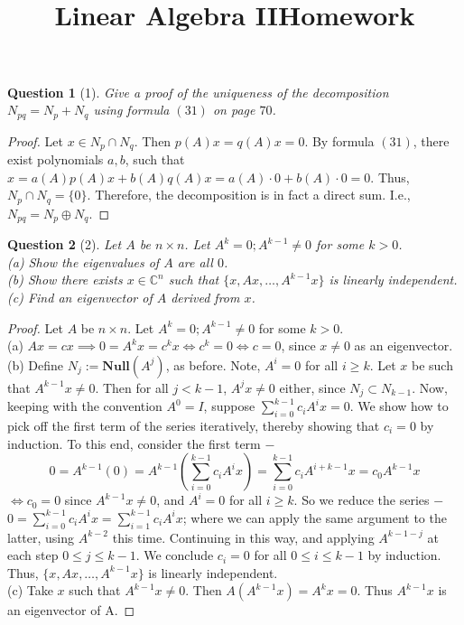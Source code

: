 \documentclass[11pt]{article}
\title{\vspace{-50pt}
\Huge \name
\\\vspace{20pt}
\huge Linear Algebra II\hfill Homework \hw}
\author{}
\date{}
\theoremstyle{quest}
\newtheorem*{question}{Question}
\begin{document}
\maketitle

\begin{question}[1]
Give a proof of the uniqueness of the decomposition $N_{pq} = N_p + N_q$ using formula $(31)$ on page $70$.
\end{question}
\begin{proof}
Let $x \in N_p \cap N_q$. Then $p(A)x = q(A)x = 0$. By formula $(31)$, there exist polynomials $a, b$, such that $x = a(A)p(A)x + b(A)q(A)x = a(A) \cdot 0 + b(A) \cdot 0 = 0$. Thus, $N_p \cap N_q = \{0\}$. Therefore, the decomposition is in fact a direct sum. I.e., $N_{pq} = N_p \oplus N_q$.
\end{proof}
\begin{question}[2]
Let $A$ be $n \times n$. Let $A^k = 0; A^{k-1} \ne 0$ for some $k > 0$.
\\(a) Show the eigenvalues of $A$ are all $0$.
\\(b) Show there exists $x \in \mathbb{C}^n$ such that $\{x, Ax, \ldots, A^{k-1}x\}$ is linearly independent.
\\(c) Find an eigenvector of $A$ derived from $x$.
\end{question}
\begin{proof}
Let $A$ be $n \times n$. Let $A^k = 0; A^{k-1} \ne 0$ for some $k > 0$.
\\(a) $Ax = cx \implies 0 = A^k x = c^k x \iff c^k = 0 \iff c = 0$, since $x \ne 0$ as an eigenvector.
\\ (b) Define $N_j := \mathbf{Null}(A^j)$, as before. Note, $A^i = 0$ for all $i \ge k$. Let $x$ be such that $A^{k-1}x \ne 0$. Then for all $j < k-1$, $A^j x \ne 0$ either, since $N_j \subset N_{k-1}$. Now, keeping with the convention $A^0 = I$, suppose $\sum_{i = 0}^{k-1} c_i A^i x = 0$. We show how to pick off the first term of the series iteratively, thereby showing that $c_i = 0$ by induction. To this end, consider the first term $-$
$$0 = A^{k-1}(0) = A^{k-1}(\sum_{i = 0}^{k-1} c_i A^i x) = \sum_{i = 0}^{k-1} c_i A^{i+k-1} x = c_0 A^{k-1} x$$
$\iff c_0 = 0$ since $A^{k-1}x \ne 0$, and $A^i = 0$ for all $i \ge k$. So we reduce the series $-$ $0 = \sum_{i = 0}^{k-1} c_i A^i x = \sum_{i = 1}^{k-1} c_i A^i x$; where we can apply the same argument to the latter, using $A^{k-2}$ this time. Continuing in this way, and applying $A^{k-1-j}$ at each step $ 0 \le j \le k-1$. We conclude $c_i = 0$ for all $ 0 \le i \le k-1$ by induction. Thus, $\{x, Ax, \ldots, A^{k-1}x\}$ is linearly independent.
\\(c) Take $x$ such that $A^{k-1} x \ne 0$. Then $A(A^{k-1} x) = A^k x = 0$. Thus $A^{k-1} x$ is an eigenvector of A.
\end{proof}
\end{document}
